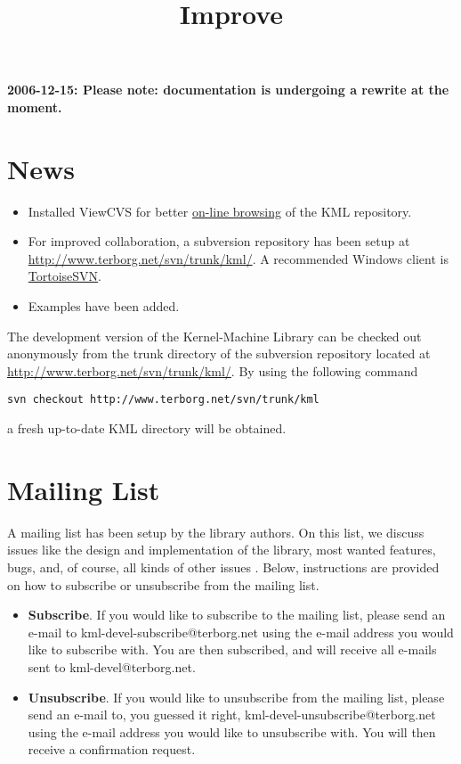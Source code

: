\documentclass{article}
\begin{document}
\title{Improve}
\maketitle

\textbf{2006-12-15: Please note: documentation is undergoing a rewrite at the moment.}

\section*{News}

\begin{itemize}

\item Installed ViewCVS for better 
\href{http://www.terborg.net/cgi-bin/viewcvs.cgi/trunk/kml/}{on-line browsing}
of the KML repository.
\item For improved collaboration, a subversion repository has been 
setup at \href{http://www.terborg.net/svn/trunk/kml/}{http://www.terborg.net/svn/trunk/kml/}. A
recommended Windows client is \href{http://tortoisesvn.tigris.org/}{TortoiseSVN}.
\item Examples have been added.

\end{itemize}


The development version of the Kernel-Machine Library can be checked out anonymously from 
the trunk directory of the subversion repository located at 
\href{http://www.terborg.net/svn/trunk/kml/}{http://www.terborg.net/svn/trunk/kml/}. By using the following command
\begin{verbatim}
svn checkout http://www.terborg.net/svn/trunk/kml
\end{verbatim}
a fresh up-to-date KML directory will be obtained. 

\section*{Mailing List}
A mailing list has been setup by the library authors. 
On this list, we discuss issues like the design and implementation of the library, 
most wanted features, bugs,
and, of course, all kinds of other issues \smile.
Below, instructions are provided on how to subscribe or unsubscribe from the mailing list.

\begin{itemize}
\item \textbf{Subscribe}. If you would like to subscribe to the mailing list, please send an
e-mail to kml-devel-subscribe@terborg.net using the e-mail address you would like to subscribe
with. You are then subscribed, and will receive all e-mails sent to kml-devel@terborg.net.
\item \textbf{Unsubscribe}. If you would like to unsubscribe from the mailing list,
please send an e-mail to, you guessed it right, kml-devel-unsubscribe@terborg.net
using the e-mail address you would like to unsubscribe with. 
You will then receive a confirmation request.
\end{itemize}
\end{document}
